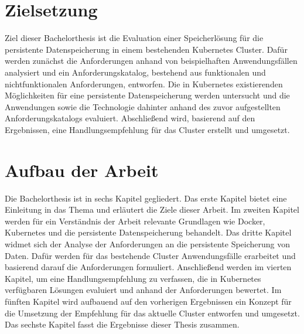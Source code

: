 %
%
\section{Zielsetzung} %
\label{sec:ziel}
Ziel dieser Bachelorthesis ist die Evaluation einer Speicherlösung für die persistente Datenspeicherung in einem bestehenden Kubernetes Cluster.
Dafür werden zunächst die Anforderungen anhand von beispielhaften Anwendungsfällen analysiert und ein Anforderungskatalog, bestehend aus funktionalen und nichtfunktionalen Anforderungen, entworfen.
Die in Kubernetes existierenden Möglichkeiten für eine persistente Datenspeicherung werden untersucht und die Anwendungen sowie die Technologie dahinter anhand des zuvor aufgestellten Anforderungskatalogs evaluiert.
Abschließend wird, basierend auf den Ergebnissen, eine Handlungsempfehlung für das Cluster erstellt und umgesetzt.

%
%
\section{Aufbau der Arbeit} %
\label{sec:aufbau}
Die Bachelorthesis ist in sechs Kapitel gegliedert. Das erste Kapitel bietet eine Einleitung in das Thema und erläutert die Ziele dieser Arbeit.
Im zweiten Kapitel werden für ein Verständnis der Arbeit relevante Grundlagen wie Docker, Kubernetes und die persistente Datenspeicherung behandelt.
Das dritte Kapitel widmet sich der Analyse der Anforderungen an die persistente Speicherung von Daten.
Dafür werden für das bestehende Cluster Anwendungsfälle erarbeitet und basierend darauf die Anforderungen formuliert.
Anschließend werden im vierten Kapitel, um eine Handlungsempfehlung zu verfassen, die in Kubernetes verfügbaren Lösungen evaluiert und anhand der Anforderungen bewertet.
Im fünften Kapitel wird aufbauend auf den vorherigen Ergebnissen ein Konzept für die Umsetzung der Empfehlung für das aktuelle Cluster entworfen und umgesetzt.
Das sechste Kapitel fasst die Ergebnisse dieser Thesis zusammen.